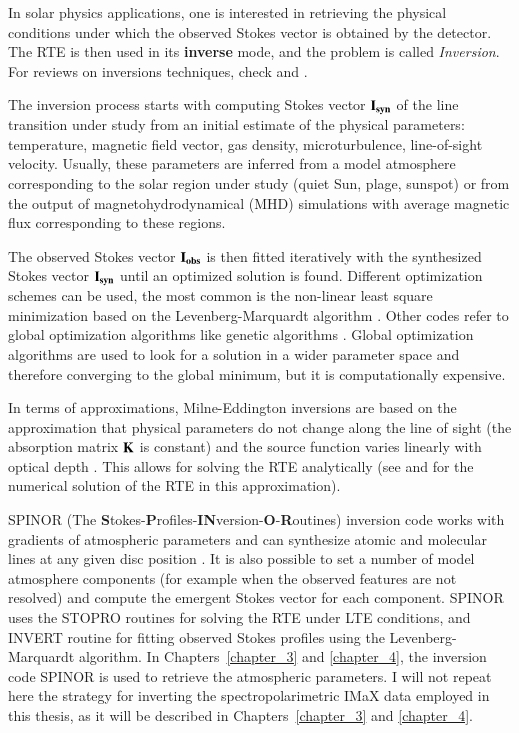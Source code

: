 \documentclass[goettingen, gauss, print]{thesis}
\begin{document}
In solar physics applications, one is interested in retrieving the physical conditions under which the observed Stokes vector is obtained by the detector. The RTE is then used in its \textbf{inverse} mode, and the problem is called \textit{Inversion}. For reviews on inversions techniques, check \cite{del_toro_iniesta_stokes_1996} and \cite{bellot_rubio_stokes_2006}.

The inversion process starts with computing Stokes vector $\bold{I_{syn}}$ of the line transition under study from an initial estimate of the physical parameters: temperature, magnetic field vector, gas density, microturbulence, line-of-sight velocity. Usually, these parameters are inferred from a model atmosphere corresponding to the solar region under study (quiet Sun, plage, sunspot) or from the output of magnetohydrodynamical (MHD) simulations with average magnetic flux corresponding to these regions.

The observed Stokes vector $\bold{I_{obs}}$ is then fitted iteratively with the synthesized Stokes vector $\bold{I_{syn}}$ until an optimized solution is found. Different optimization schemes can be used, the most common is the non-linear least square minimization based on the Levenberg-Marquardt algorithm \citep{press_numerical_2007} \citep[e.g.][]{ruiz_cobo_inversion_1992,ruiz_cobo_sensitivity_1994}. Other codes refer to global optimization algorithms like genetic algorithms \cite[PIKAIA;][]{lagg_retrieval_2004}. Global optimization algorithms are used to look for a solution in a wider parameter space and therefore converging to the global minimum, but it is computationally expensive. 

In terms of approximations, Milne-Eddington inversions are based on the approximation that physical parameters do not change along the line of sight (the absorption matrix $\bold{K}$ is constant) and the source function varies linearly with optical depth \citep[e.g.,][]{lagg_retrieval_2004, borrero_inferring_2011}. This allows for solving the RTE analytically (see \cite{landi_deglinnocenti_magnetic_1992} and \cite{del_toro_iniesta_introduction_2003} for the numerical solution of the RTE in this approximation).


SPINOR (The {\bf S}tokes-{\bf P}rofiles-{\bf IN}version-{\bf O}-{\bf R}outines) inversion code works with gradients of atmospheric parameters and can synthesize atomic and molecular lines at any given disc position \citep{frutiger_properties_2000}. It is also possible to set a number of model atmosphere components (for example when the observed features are not resolved) and compute the emergent Stokes vector for each component. SPINOR uses the STOPRO routines \citep{solanki_photospheric_1987} for solving the RTE under LTE conditions, and INVERT routine for fitting observed Stokes profiles using the Levenberg-Marquardt algorithm.
In Chapters~\ref{chapter_3} and \ref{chapter_4}, the inversion code SPINOR is used to retrieve the atmospheric parameters. I will not repeat here the strategy for inverting the spectropolarimetric IMaX data employed in this thesis, as it will be described in Chapters~\ref{chapter_3} and \ref{chapter_4}.
\end{document}
